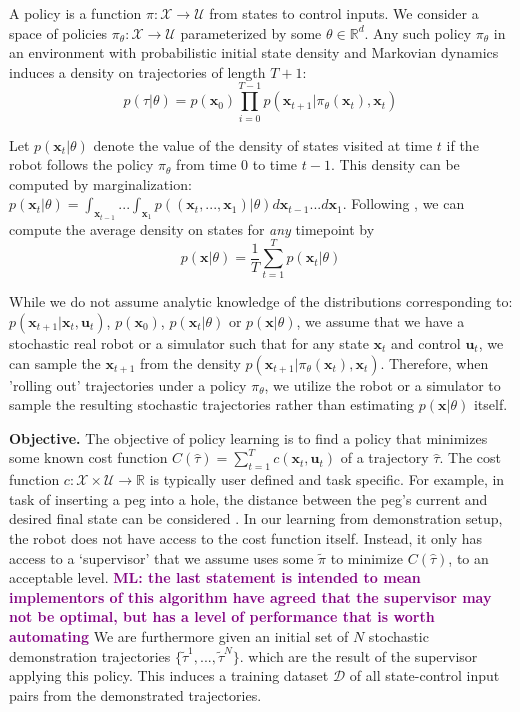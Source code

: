 \documentclass[10pt, conference]{ieeeconf}      %
\newcommand{\bu}{\mathbf{u}}
\newcommand{\bx}{\mathbf{x}}
\newcommand{\mlnote}[1]{\ifthenelse{\boolean{include-notes}}%
 {\textcolor{purple}{\textbf{ML: #1}}}{}}
\begin{document}
A policy is a function $\pi: \mathcal{X} \to \mathcal{U}$ from states to control inputs. 
We consider a space of policies $\pi_{\theta}:\mathcal{X}\to \mathcal{U}$ parameterized by some $\theta\in \mathbb{R}^d$. Any such policy $\pi_{\theta}$ in an environment with probabilistic initial state density and Markovian dynamics
induces a density on trajectories of length $T+1$: $$p(\tau | \theta)=
p(\bx_0)\prod_{i=0}^{T-1}p(\bx_{t+1}|\pi_{\theta}(\bx_t),\bx_t)$$


Let $p(\bx_t|\theta)$ denote the value of the density of states visited at time $t$ if the robot follows the policy
$\pi_{\theta}$ from time $0$ to time $t-1$. This density can be computed by marginalization: $p(\bx_t|\theta) =
\int_{\bx_{t-1}}...\int_{\bx_1} p((\bx_t,...,\bx_1)|\theta) d\bx_{t-1}...d\bx_1$. Following \cite{ross2010reduction}, we can compute
the average density on states for \emph{any} timepoint by 
\begin{equation}
p(\bx|\theta) = \frac{1}{T} \sum^T_{t=1} p(\bx_t|\theta)
\label{eq:density}
\end{equation}


While we do not assume analytic knowledge of the distributions corresponding to: $p(\bx_{t+1}|\bx_t,\bu_t)$, $p(\bx_0)$, $p(\bx_t|
\theta)$ or $p(\bx|\theta)$, we assume that we have a stochastic real robot or a simulator such that for any state
$\bx_t$ and control $\bu_t$, we can sample the $\bx_{t+1}$ from the density $p(\bx_{t+1}|\pi_{\theta}(\bx_t),\bx_t)$. 
Therefore, when 'rolling out' trajectories under a policy
$\pi_{\theta}$, we utilize the robot or a simulator to sample the resulting stochastic trajectories rather than
estimating $p(\bx|\theta)$ itself.

\noindent\textbf{Objective.} The objective of policy learning is to find a policy that minimizes some known cost function
$C(\hat{\tau}) = \sum^T_{t=1} c(\bx_t,\bu_t)$ of a trajectory $\hat{\tau}$. The cost function $c:\mathcal{X}\times \mathcal{U}\to \mathbb{R}$ is typically user defined and task specific. 
For example, in task of inserting a peg into a hole, the distance between the peg's current and desired final state can
be considered \cite{levine2015end}.  
In our learning from demonstration setup, the robot does not have access to the cost function itself. Instead, it only has access to 
a `supervisor' that we assume uses some $\tilde{\pi}$ to minimize $C(\hat{\tau})$, to an acceptable level. \mlnote{the last statement is intended to mean implementors of this algorithm have agreed that the supervisor may not be optimal, but has a level of performance that is worth automating} We are furthermore given
an initial set of $N$ stochastic demonstration trajectories $\lbrace \tilde{\tau}^1,...,\tilde{\tau}^N \rbrace$. 
which are the result of the supervisor applying this policy. This induces a training dataset $\mathcal{D}$ of all state-control input pairs from the demonstrated trajectories. 
\end{document}
